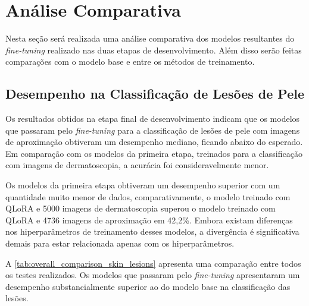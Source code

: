 \chapter{Análise Comparativa}

Nesta seção será realizada uma análise comparativa dos modelos resultantes do \textit{fine-tuning} realizado nas duas
etapas de desenvolvimento. Além disso serão feitas comparações com o modelo base e entre os métodos de treinamento.

\section{Desempenho na Classificação de Lesões de Pele}

Os resultados obtidos na etapa final de desenvolvimento indicam que os modelos que passaram pelo \textit{fine-tuning}
para a classificação de lesões de pele com imagens de aproximação obtiveram um desempenho mediano, ficando abaixo do
esperado. Em comparação com os modelos da primeira etapa, treinados para a classificação com imagens de dermatoscopia,
a
acurácia foi consideravelmente menor.

Os modelos da primeira etapa obtiveram um desempenho superior com um quantidade muito menor de dados, comparativamente,
o modelo treinado com \ac{QLoRA} e 5000 imagens de dermatoscopia superou o modelo treinado com \ac{QLoRA} e 4736
imagens de aproximação em 42,2\%. Embora existam diferenças nos hiperparâmetros de treinamento desses modelos, a
divergência é significativa demais para estar relacionada apenas com os hiperparâmetros.

A \autoref{tab:overall_comparison_skin_lesions} apresenta uma comparação entre todos os testes realizados. Os modelos
que passaram pelo \textit{fine-tuning} apresentaram um desempenho substancialmente superior ao do modelo base na
classificação das lesões.

